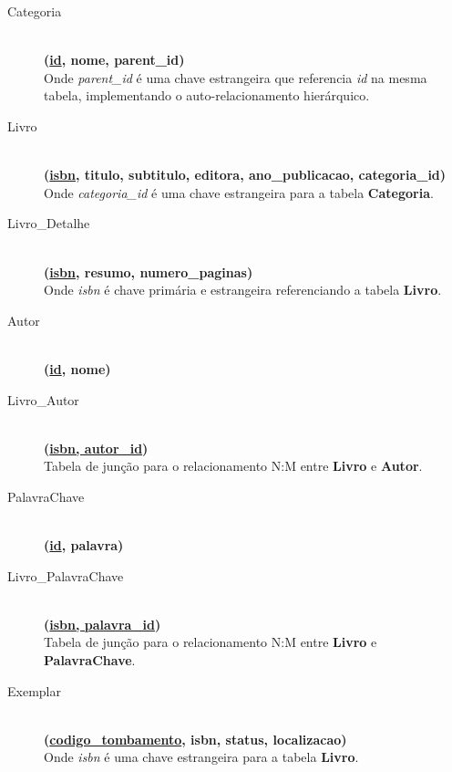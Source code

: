 \documentclass[12pt,a4paper]{article}
\begin{document}
\begin{conceptbox}
\begin{description}
    \item[Categoria] \hfill \\
    \textbf{(\underline{id}, nome, parent\_id)} \\
    Onde \textit{parent\_id} é uma chave estrangeira que referencia \textit{id} na mesma tabela, implementando o auto-relacionamento hierárquico.
    
    \item[Livro] \hfill \\
    \textbf{(\underline{isbn}, titulo, subtitulo, editora, ano\_publicacao, categoria\_id)} \\
    Onde \textit{categoria\_id} é uma chave estrangeira para a tabela \textbf{Categoria}.
    
    \item[Livro\_Detalhe] \hfill \\
    \textbf{(\underline{isbn}, resumo, numero\_paginas)} \\
    Onde \textit{isbn} é chave primária e estrangeira referenciando a tabela \textbf{Livro}.
    
    \item[Autor] \hfill \\
    \textbf{(\underline{id}, nome)}
    
    \item[Livro\_Autor] \hfill \\
    \textbf{(\underline{isbn, autor\_id})} \\
    Tabela de junção para o relacionamento N:M entre \textbf{Livro} e \textbf{Autor}.
    
    \item[PalavraChave] \hfill \\
    \textbf{(\underline{id}, palavra)}
    
    \item[Livro\_PalavraChave] \hfill \\
    \textbf{(\underline{isbn, palavra\_id})} \\
    Tabela de junção para o relacionamento N:M entre \textbf{Livro} e \textbf{PalavraChave}.
    
    \item[Exemplar] \hfill \\
    \textbf{(\underline{codigo\_tombamento}, isbn, status, localizacao)} \\
    Onde \textit{isbn} é uma chave estrangeira para a tabela \textbf{Livro}.
    

\end{description}
\end{conceptbox}
\end{document}
